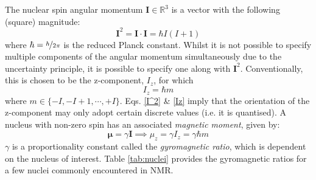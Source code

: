 The nuclear spin angular momentum $\symbf{I} \in
\mathbb{R}^3$ is a vector with the following (square) magnitude:
\begin{equation}
  \label{I^2}
  \symbf{I}^2 = \symbf{I} \cdot \symbf{I} = \hbar I (I + 1)
\end{equation}
where $\hbar = \nicefrac{h}{2 \pi}$ is the reduced Planck constant. Whilst it
is not possible to specify multiple components of the angular momentum
simultaneously due to the uncertainty principle, it is possible to specify one
along with $\symbf{I}^2$. Conventionally, this is chosen to be the z-component,
$I_z$, for which
\begin{equation}
  \label{Iz}
  I_z = \hbar m
\end{equation}
where $m \in \lbrace -I, -I+1, \cdots, +I \rbrace$. Eqs. \ref{I^2} \& \ref{Iz}
imply that the orientation of the z-component may only adopt certain discrete
values (i.e. it is quantised). A nucleus with non-zero spin has an associated
\textit{magnetic moment}, given by:
\begin{equation}
  \symbf{\mu} = \gamma \symbf{I} \implies \mu_z = \gamma I_z = \gamma \hbar m
\end{equation}
$\gamma$ is a proportionality constant called the \textit{gyromagnetic ratio},
which is dependent on the nucleus of interest. Table \ref{tab:nuclei} provides
the gyromagnetic ratios for a few nuclei commonly encountered in NMR.

